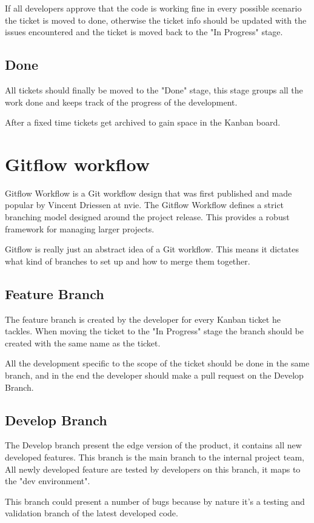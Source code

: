 \begin{spacing}{1.2}
If all developers approve that the code is working fine in every possible scenario the ticket is moved to done, otherwise the ticket info should be updated with the issues encountered and the ticket is moved back to the "In Progress" stage.

\subsection{Done}
All tickets should finally be moved to the "Done" stage, this stage groups all the work done and keeps track of the progress of the development.


After a fixed time tickets get archived to gain space in the Kanban board.
\section{Gitflow workflow }
Gitflow Workflow is a Git workflow design that was first published and made popular by Vincent Driessen at nvie. The Gitflow Workflow defines a strict branching model designed around the project release. This provides a robust framework for managing larger projects. 

Gitflow is really just an abstract idea of a Git workflow. This means it dictates what kind of branches to set up and how to merge them together. 
\subsection{Feature Branch}
The feature branch is created by the developer for every Kanban ticket he tackles. When moving the ticket to the "In Progress" stage the branch should be created with the same name as the ticket.

All the development specific to the scope of the ticket should be done in the same branch, and in the end the developer should make a pull request on the Develop Branch.
\subsection{Develop Branch}
The Develop branch present the edge version of the product, it contains all new developed features. This branch is the main branch to the internal project team, All newly developed feature are tested by developers on this branch, it maps to the "dev environment".

This branch could present a number of bugs because by nature it's a testing and validation branch of the latest developed code. 


\end{spacing}
